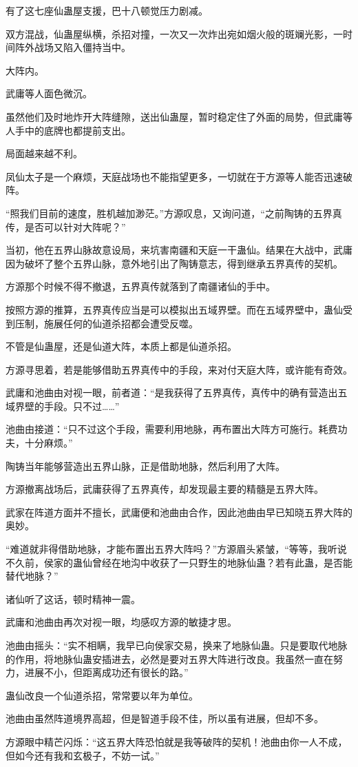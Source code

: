 \begin{this_body}
有了这七座仙蛊屋支援，巴十八顿觉压力剧减。

双方混战，仙蛊屋纵横，杀招对撞，一次又一次炸出宛如烟火般的斑斓光影，一时间阵外战场又陷入僵持当中。

大阵内。

武庸等人面色微沉。

虽然他们及时地炸开大阵缝隙，送出仙蛊屋，暂时稳定住了外面的局势，但武庸等人手中的底牌也都提前支出。

局面越来越不利。

凤仙太子是一个麻烦，天庭战场也不能指望更多，一切就在于方源等人能否迅速破阵。

“照我们目前的速度，胜机越加渺茫。”方源叹息，又询问道，“之前陶铸的五界真传，是否可以针对大阵呢？”

当初，他在五界山脉故意设局，来坑害南疆和天庭一干蛊仙。结果在大战中，武庸因为破坏了整个五界山脉，意外地引出了陶铸意志，得到继承五界真传的契机。

方源那个时候不得不撤退，五界真传就落到了南疆诸仙的手中。

按照方源的推算，五界真传应当是可以模拟出五域界壁。而在五域界壁中，蛊仙受到压制，施展任何的仙道杀招都会遭受反噬。

不管是仙蛊屋，还是仙道大阵，本质上都是仙道杀招。

方源寻思着，若是能够借助五界真传中的手段，来对付天庭大阵，或许能有奇效。

武庸和池曲由对视一眼，前者道：“是我获得了五界真传，真传中的确有营造出五域界壁的手段。只不过……”

池曲由接道：“只不过这个手段，需要利用地脉，再布置出大阵方可施行。耗费功夫，十分麻烦。”

陶铸当年能够营造出五界山脉，正是借助地脉，然后利用了大阵。

方源撤离战场后，武庸获得了五界真传，却发现最主要的精髓是五界大阵。

武家在阵道方面并不擅长，武庸便和池曲由合作，因此池曲由早已知晓五界大阵的奥妙。

“难道就非得借助地脉，才能布置出五界大阵吗？”方源眉头紧皱，“等等，我听说不久前，侯家的蛊仙曾经在地沟中收获了一只野生的地脉仙蛊？若有此蛊，是否能替代地脉？”

诸仙听了这话，顿时精神一震。

武庸和池曲由再次对视一眼，均感叹方源的敏捷才思。

池曲由摇头：“实不相瞒，我早已向侯家交易，换来了地脉仙蛊。只是要取代地脉的作用，将地脉仙蛊安插进去，必然是要对五界大阵进行改良。我虽然一直在努力，进展不小，但距离成功还有很长的路。”

蛊仙改良一个仙道杀招，常常要以年为单位。

池曲由虽然阵道境界高超，但是智道手段不佳，所以虽有进展，但却不多。

方源眼中精芒闪烁：“这五界大阵恐怕就是我等破阵的契机！池曲由你一人不成，但如今还有我和玄极子，不妨一试。”

\end{this_body}

